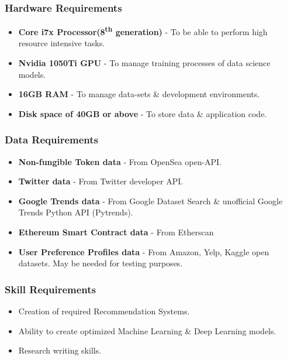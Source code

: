 \documentclass[a4paper, 12pt, oneside]{report}
\begin{document}
\subsubsection{Hardware Requirements}
\begin{itemize}
\item \textbf{Core i7x Processor(8\textsuperscript{th} generation)} - To be able to perform high resource intensive tasks.
\item \textbf{Nvidia 1050Ti GPU} - To manage training processes of data science models.
\item \textbf{16GB RAM} - To manage data-sets \& development environments.
\item \textbf{Disk space of 40GB or above} - To store data \& application code.
\end{itemize}

\subsubsection{Data Requirements}
\begin{itemize}
\item \textbf{Non-fungible Token data} - From OpenSea open-API.
\item \textbf{Twitter data} - From Twitter developer API.
\item \textbf{Google Trends data} - From Google Dataset Search \& unofficial Google Trends Python API (Pytrends).
\item \textbf{Ethereum Smart Contract data} - From Etherscan
\item \textbf{User Preference Profiles data} - From Amazon, Yelp, Kaggle open datasets. May be needed for testing purposes.
\end{itemize}

\subsubsection{Skill Requirements}
\begin{itemize}
\item Creation of required Recommendation Systems.
\item Ability to create optimized Machine Learning \& Deep Learning models.
\item Research writing skills.
\end{itemize}
\end{document}

